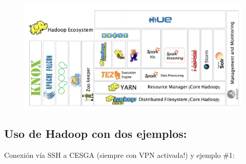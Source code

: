 \documentclass[]{book}
\begin{document}
\begin{figure}
\centering
\includegraphics{images/T3-ecosistema.png}
\caption{}
\end{figure}

\subsection{Uso de Hadoop con dos
ejemplos:}\label{uso-de-hadoop-con-dos-ejemplos}

Conexión vía SSH a CESGA (siempre con VPN activada!) y ejemplo \#1:
\end{document}
